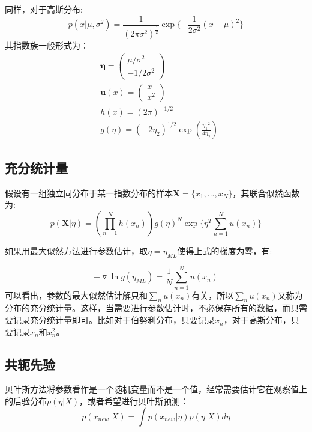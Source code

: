 同样，对于高斯分布:
\begin{equation}
p(x|\mu,\sigma^2) = {\frac{1}{{(2\pi\sigma^2)}^\frac{1}{2}}} \exp\{-\frac{1}{2\sigma^2}(x-\mu)^2\}\label{eq:gaussian_dis}
\end{equation}
其指数族一般形式为：
\begin{equation}
\begin{split}
&{\bm \eta} = \begin{pmatrix}
\mu/\sigma^2\\
-1/2\sigma^2
\end{pmatrix}\\
&{\bm u}(x) = \begin{pmatrix}
x\\
x^2
\end{pmatrix}\\
&h(x) = {(2\pi)}^{-1/2}\\
&g(\eta) = (-2\eta_2)^{1/2}{\exp{(\frac{{\eta_1}^2}{4\eta_2})}}
\end{split}
\end{equation}

\subsection{充分统计量}
假设有一组独立同分布于某一指数分布的样本${\bm X} = \{x_1,...,x_N\}$，其联合似然函数为:
\begin{equation}
p({\bm X}|\eta) = (\prod_{n=1}^{N}{h(x_n)}){g(\eta)}^N \exp\{\eta^T\sum_{n=1}^{N}{u(x_n)}\}\label{eq:exp_joint_likelihood}
\end{equation}

如果用最大似然方法进行参数估计，取$\eta = \eta_{ML}$使得上式的梯度为零，有:

\begin{equation}
-\triangledown \ln g(\eta_{ML}) = \frac{1}{N}\sum_{n=1}^N{u(x_n)}
\end{equation}
可以看出，参数的最大似然估计解只和$\sum_{n}{u(x_n)}$有关，所以$\sum_{n}{u(x_n)}$又称为分布的充分统计量。这样，当需要进行参数估计时，不必保存所有的数据，而只需要记录充分统计量即可。比如对于伯努利分布，只要记录${x_n}$，对于高斯分布，只要记录${x_n}$和${x_n^2}$。
\subsection{共轭先验}

贝叶斯方法将参数看作是一个随机变量而不是一个值，经常需要估计它在观察值上的后验分布$p(\eta|X)$，或者希望进行贝叶斯预测：
\begin{equation}
p(x_{new}|X) = \int p(x_{new}|\eta) p(\eta|X)d \eta
\end{equation}

